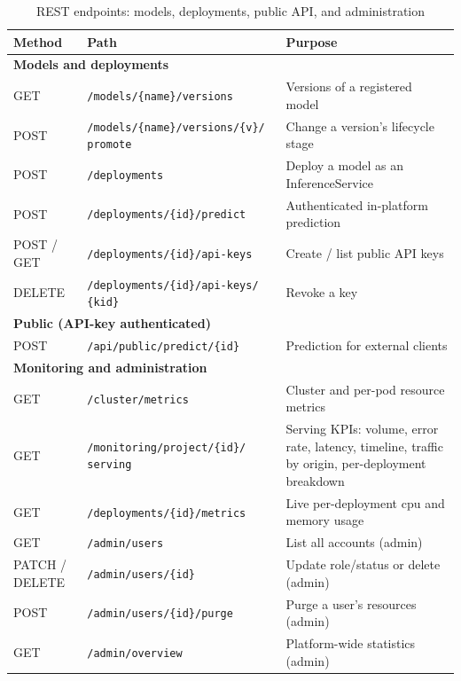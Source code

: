 \begin{table}[H]\centering
\renewcommand{\arraystretch}{1.2}
\caption{REST endpoints: models, deployments, public API, and administration}
\label{tab:api-ref2}
\footnotesize
\begin{tabularx}{\textwidth}{|p{2.1cm}|p{5.6cm}|X|}
\hline
\textbf{Method} & \textbf{Path} & \textbf{Purpose}\\
\hline
\multicolumn{3}{|l|}{\cellcolor{primary!12}\textbf{Models and deployments}}\\ \hline
GET  & \texttt{/models/\{name\}/versions} & Versions of a registered model\\ \hline
POST & \texttt{/models/\{name\}/versions/\{v\}/ promote} & Change a version's lifecycle stage\\ \hline
POST & \texttt{/deployments} & Deploy a model as an InferenceService\\ \hline
POST & \texttt{/deployments/\{id\}/predict} & Authenticated in-platform prediction\\ \hline
POST / GET & \texttt{/deployments/\{id\}/api-keys} & Create / list public API keys\\ \hline
DELETE & \texttt{/deployments/\{id\}/api-keys/ \{kid\}} & Revoke a key\\ \hline
\multicolumn{3}{|l|}{\cellcolor{primary!12}\textbf{Public (API-key authenticated)}}\\ \hline
POST & \texttt{/api/public/predict/\{id\}} & Prediction for external clients\\ \hline
\multicolumn{3}{|l|}{\cellcolor{primary!12}\textbf{Monitoring and administration}}\\ \hline
GET  & \texttt{/cluster/metrics} & Cluster and per-pod resource metrics\\ \hline
GET  & \texttt{/monitoring/project/\{id\}/ serving} & Serving KPIs: volume, error rate, latency, timeline, traffic by origin, per-deployment breakdown\\ \hline
GET  & \texttt{/deployments/\{id\}/metrics} & Live per-deployment \gls{cpu} and memory usage\\ \hline
GET  & \texttt{/admin/users} & List all accounts (admin)\\ \hline
PATCH / DELETE & \texttt{/admin/users/\{id\}} & Update role/status or delete (admin)\\ \hline
POST & \texttt{/admin/users/\{id\}/purge} & Purge a user's resources (admin)\\ \hline
GET  & \texttt{/admin/overview} & Platform-wide statistics (admin)\\ \hline
\end{tabularx}
\end{table}

